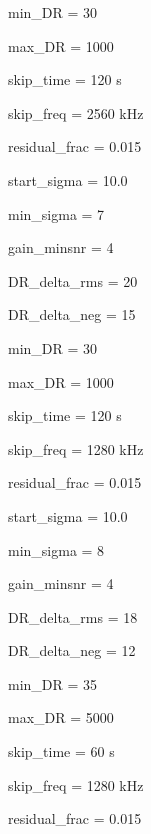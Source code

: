 \documentclass[letterpaper,10pt,english]{sphinxmanual}
\begin{document}
\sphinxAtStartPar
min\_DR                  =       30

\sphinxAtStartPar
max\_DR                  =       1000

\sphinxAtStartPar
skip\_time               =       120 s

\sphinxAtStartPar
skip\_freq               =       2560 kHz

\sphinxAtStartPar
{}

\sphinxAtStartPar
residual\_frac   =       0.015

\sphinxAtStartPar
start\_sigma             =       10.0

\sphinxAtStartPar
min\_sigma               =       7

\sphinxAtStartPar
gain\_minsnr             =       4

\sphinxAtStartPar
DR\_delta\_rms    =       20

\sphinxAtStartPar
DR\_delta\_neg    =       15

\sphinxAtStartPar
min\_DR                  =       30

\sphinxAtStartPar
max\_DR                  =       1000

\sphinxAtStartPar
skip\_time               =       120 s

\sphinxAtStartPar
skip\_freq               =       1280 kHz

\sphinxAtStartPar
{}

\sphinxAtStartPar
residual\_frac   =       0.015

\sphinxAtStartPar
start\_sigma             =       10.0

\sphinxAtStartPar
min\_sigma               =       8

\sphinxAtStartPar
gain\_minsnr             =       4

\sphinxAtStartPar
DR\_delta\_rms    =       18

\sphinxAtStartPar
DR\_delta\_neg    =       12

\sphinxAtStartPar
min\_DR                  =       35

\sphinxAtStartPar
max\_DR                  =       5000

\sphinxAtStartPar
skip\_time               =       60 s

\sphinxAtStartPar
skip\_freq               =       1280 kHz

\sphinxAtStartPar
{}

\sphinxAtStartPar
residual\_frac   =       0.015
\end{document}

